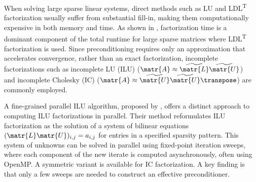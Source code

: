When solving large sparse linear systems, direct methods such as LU and
LDL\textsuperscript{T} factorization usually suffer from substantial fill-in,
making them computationally expensive in both memory and time. As shown in
\cite{wong_exploring_2024}, factorization time is a dominant component of the
total runtime for large sparse matrices where LDL\textsuperscript{T}
factorization is used. Since preconditioning requires only an approximation that
accelerates convergence, rather than an exact factorization, incomplete
factorizations such as incomplete LU (ILU) (\(\matr{A} \approx
\widetilde{\matr{L}} \widetilde{\matr{U}}\)) and incomplete Cholesky (IC)
(\(\matr{A} \approx \widetilde{\matr{U}} \widetilde{\matr{U}}\transpose\)) are
commonly employed.

A fine-grained parallel ILU algorithm, proposed by
\textcite{chow_fine-grained_2015}, offers a distinct approach to computing ILU
factorizations in parallel. Their method reformulates ILU factorization as the
solution of a system of bilinear equations \((\matr{L} \matr{U})_{i,j} =
a_{i,j}\) for entries in a specified sparsity pattern. This system of unknowns
can be solved in parallel using fixed-point iteration sweeps, where each
component of the new iterate is computed asynchronously, often using OpenMP. A
symmetric variant is available for IC factorization. A key finding is that only
a few sweeps are needed to construct an effective preconditioner.

